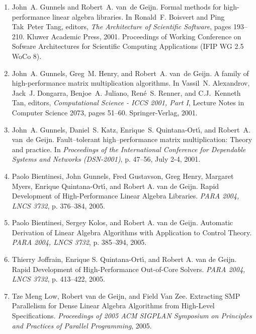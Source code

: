 \begin{enumerate}

\item
John~A. Gunnels and Robert~A. van~de Geijn.
\newblock
Formal methods for high-performance linear algebra libraries.
\newblock
In Ronald~F. Boisvert and Ping Tak~Peter Tang, editors,
{\em The Architecture of Scientific Software},
pages 193--210. Kluwer Academic Press, 2001.
\newblock
{Proceedings} of {Working} {Conference} on {Sofware} {Architectures}
for {Scientific} {Computing} {Applications} ({IFIP} {WG} 2.5 {WoCo} 8).

\item
John~A. Gunnels, Greg~M. Henry, and Robert~A. van~de Geijn.
\newblock
A family of high-performance matrix multiplication algorithms.
\newblock
In Vassil~N. Alexandrov, Jack~J. Dongarra, Benjoe~A. Juliano,
Ren\'e~S. Renner, and C.J.~Kenneth Tan, editors,
{\em Computational Science - ICCS 2001, Part I},
Lecture Notes in Computer Science 2073,
pages 51--60. Springer-Verlag, 2001.

\item
John~A. Gunnels, Daniel~S. Katz, Enrique~S. Quintana-Ort\'{\i},
and Robert~A. van~de Geijn.
\newblock
Fault--tolerant high--performance matrix multiplication: Theory and
practice.
\newblock
In {\em Proceedings of the International Conference for Dependable
Systems and Networks (DSN-2001)},
p. 47--56, July 2-4, 2001.

\item
Paolo Bientinesi, John Gunnels, Fred Gustavson, Greg Henry, 
Margaret Myers, Enrique Quintana-Ort\'{\i},
and Robert A. van de Geijn.
\newblock
Rapid Development of High-Performance Linear Algebra Libraries.
\newblock
{\em PARA 2004, LNCS 3732},
p. 376--384, 2005.

\item
Paolo Bientinesi, Sergey Kolos, and Robert A. van de Geijn.
\newblock
Automatic Derivation of Linear Algebra Algorithms with Application
to Control Theory.
\newblock
{\em PARA 2004, LNCS 3732},
p. 385--394, 2005.

\item
Thierry Joffrain, Enrique S. Quintana-Ort\'{\i},
and Robert A. van de Geijn.
\newblock
Rapid Development of High-Performance Out-of-Core Solvers.
\newblock
{\em PARA 2004, LNCS 3732},
p. 413--422, 2005.

\item
Tze Meng Low, Robert van de Geijn, and Field Van Zee.
\newblock
Extracting SMP Parallelism for Dense Linear 
Algebra Algorithms from High-Level Specifications.
\newblock
{\em Proceedings of 2005 ACM SIGPLAN Symposium on Principles and Practices
of Parallel Programming}, 2005.


\end{enumerate}

